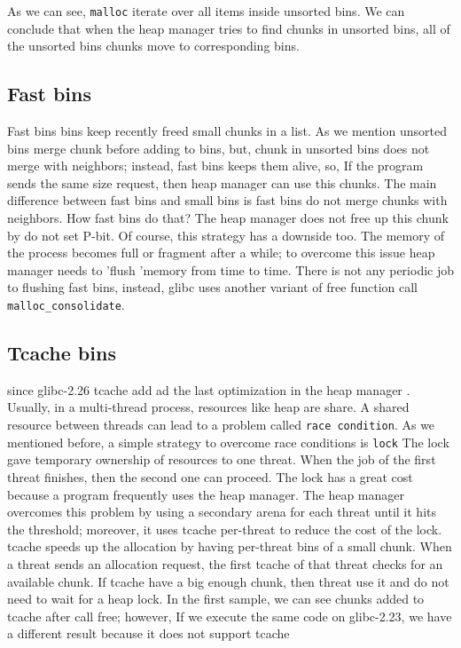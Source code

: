 \documentclass{masterthesis}
\newcommand*\libc{glibc}
\newcommand*\tch{tcache}
\newcommand*\fb{fast bins}
\newcommand*\ub{unsorted bins}
\newcommand*\sbs{small bins}
\newcommand*\Tch{Tcache\xspace}
\newcommand*\Fb{Fast bins\xspace}
\newcommand*\mallocc{\lstinline{malloc}}
\begin{document}
As we can see, \mallocc{} iterate over all items inside \ub{}. We can conclude that when the heap manager tries to find chunks in \ub{}, all of the \ub{} chunks move to corresponding bins.

\subsection{\Fb}
\Fb{} bins keep recently freed small chunks in a list. As we mention \ub{} merge chunk before adding to bins, but, chunk in \ub{} does not merge with neighbors; instead, \fb{} keeps them alive, so, If the program sends the same size request, then heap manager can use this chunks.
The main difference between \fb{} and \sbs{} is \fb{} do not merge chunks with neighbors. How \fb{} do that? The heap manager does not free up this chunk by do not set P-bit. Of course, this strategy has a downside too. The memory of the process becomes full or fragment after a while; to overcome this issue heap manager needs to 'flush 'memory from time to time. There is not any periodic job to flushing \fb{}, instead, \libc{} uses another variant of free function call \lstinline{malloc_consolidate}.

\subsection{\Tch bins}
since \libc{-2.26} \tch{} add ad the last optimization in the heap manager . Usually, in a multi-thread process, resources like heap are share. A shared resource between threads can lead to a problem called \lstinline{race condition}. As we mentioned before, a simple strategy to overcome race conditions is \lstinline{lock} The lock gave temporary ownership of resources to one threat. When the job of the first threat finishes, then the second one can proceed. The lock has a great cost because a program frequently uses the heap manager. The heap manager overcomes this problem by using a secondary arena for each threat until it hits the threshold; moreover, it uses \tch{} per-threat to reduce the cost of the lock. \tch{} speeds up the allocation by having per-threat bins of a small chunk. When a threat sends an allocation request, the first \tch{} of that threat checks for an available chunk. If \tch{} have a big enough chunk, then threat use it and do not need to wait for a heap lock. In the first sample, we can see chunks added to \tch{} after call free; however, If we execute the same code on \libc{-2.23}, we have a different result because it does not support \tch{}
\end{document}

